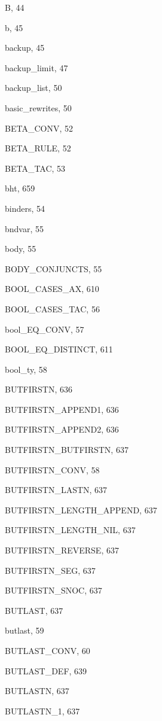 \begin{theindex}
  \indexspace

  \item {\ptt B}, 44
  \item {\ptt b}, 45
  \item {\ptt backup}, 45
  \item {\ptt backup\_limit}, 47
  \item {\ptt backup\_list}, 50
  \item {\ptt basic\_rewrites}, 50
  \item {\ptt BETA\_CONV}, 52
  \item {\ptt BETA\_RULE}, 52
  \item {\ptt BETA\_TAC}, 53
  \item {\ptt bht}, 659
  \item {\ptt binders}, 54
  \item {\ptt bndvar}, 55
  \item {\ptt body}, 55
  \item {\ptt BODY\_CONJUNCTS}, 55
  \item {\ptt BOOL\_CASES\_AX}, 610
  \item {\ptt BOOL\_CASES\_TAC}, 56
  \item {\ptt bool\_EQ\_CONV}, 57
  \item {\ptt BOOL\_EQ\_DISTINCT}, 611
  \item {\ptt bool\_ty}, 58
  \item {\ptt BUTFIRSTN}, 636
  \item {\ptt BUTFIRSTN\_APPEND1}, 636
  \item {\ptt BUTFIRSTN\_APPEND2}, 636
  \item {\ptt BUTFIRSTN\_BUTFIRSTN}, 637
  \item {\ptt BUTFIRSTN\_CONV}, 58
  \item {\ptt BUTFIRSTN\_LASTN}, 637
  \item {\ptt BUTFIRSTN\_LENGTH\_APPEND}, 637
  \item {\ptt BUTFIRSTN\_LENGTH\_NIL}, 637
  \item {\ptt BUTFIRSTN\_REVERSE}, 637
  \item {\ptt BUTFIRSTN\_SEG}, 637
  \item {\ptt BUTFIRSTN\_SNOC}, 637
  \item {\ptt BUTLAST}, 637
  \item {\ptt butlast}, 59
  \item {\ptt BUTLAST\_CONV}, 60
  \item {\ptt BUTLAST\_DEF}, 639
  \item {\ptt BUTLASTN}, 637
  \item {\ptt BUTLASTN\_1}, 637

\end{theindex}
